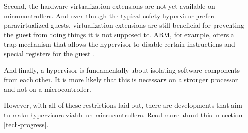 Second, the hardware virtualization extensions are not yet available on microcontrollers. And even though the typical safety hypervisor prefers paravirtualized guests, virtualization extensions are still beneficial for preventing the guest from doing things it is not supposed to. ARM, for example, offers a trap mechanism that allows the hypervisor to disable certain instructions and special registers for the guest \cite{ARM.v8.2018}. 

And finally, a hypervisor is fundamentally about isolating software components from each other. It is more likely that this is necessary on a stronger processor and not on a microcontroller.

However, with all of these restrictions laid out, there are developments that aim to make hypervisors viable on microcontrollers. Read more about this in section \ref{tech-progress}.





